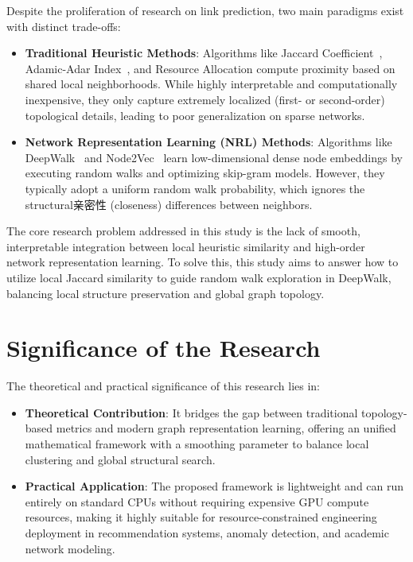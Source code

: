 Despite the proliferation of research on link prediction, two main paradigms exist with distinct trade-offs:
\begin{itemize}
    \item \textbf{Traditional Heuristic Methods}: Algorithms like Jaccard Coefficient~\citep{liben2007link}, Adamic-Adar Index~\citep{adamic2003friends}, and Resource Allocation compute proximity based on shared local neighborhoods. While highly interpretable and computationally inexpensive, they only capture extremely localized (first- or second-order) topological details, leading to poor generalization on sparse networks.
    \item \textbf{Network Representation Learning (NRL) Methods}: Algorithms like DeepWalk~\citep{perozzi2014deepwalk} and Node2Vec~\citep{grover2016node2vec} learn low-dimensional dense node embeddings by executing random walks and optimizing skip-gram models. However, they typically adopt a uniform random walk probability, which ignores the structural亲密性 (closeness) differences between neighbors.
\end{itemize}

The core research problem addressed in this study is the lack of smooth, interpretable integration between local heuristic similarity and high-order network representation learning. To solve this, this study aims to answer how to utilize local Jaccard similarity to guide random walk exploration in DeepWalk, balancing local structure preservation and global graph topology.

\section{Significance of the Research}

The theoretical and practical significance of this research lies in:
\begin{itemize}
    \item \textbf{Theoretical Contribution}: It bridges the gap between traditional topology-based metrics and modern graph representation learning, offering an unified mathematical framework with a smoothing parameter to balance local clustering and global structural search.
    \item \textbf{Practical Application}: The proposed framework is lightweight and can run entirely on standard CPUs without requiring expensive GPU compute resources, making it highly suitable for resource-constrained engineering deployment in recommendation systems, anomaly detection, and academic network modeling.
\end{itemize}

